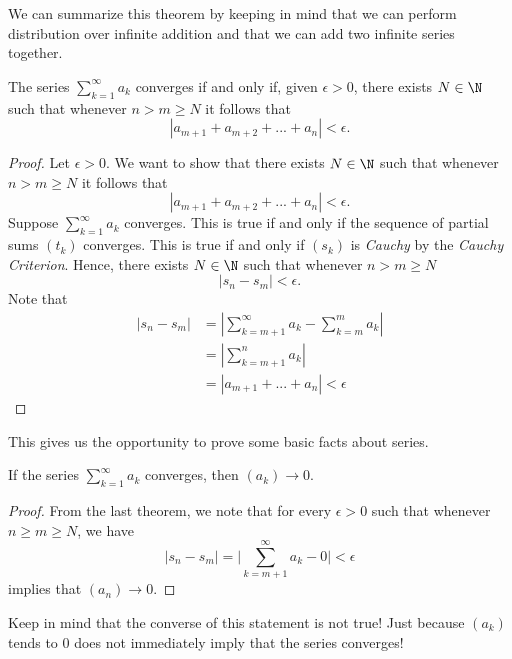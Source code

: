 We can summarize this theorem by keeping in mind that we can perform distribution over infinite addition and that we can add two infinite series together. 

\begin{tcolorbox}
    \begin{thm}
     The series \( \sum_{k=1}^{ \infty} a_k \) converges if and only if, given \( \epsilon > 0\), there exists \( N \in \N \) such that whenever \( n > m \geq N \) it follows that 
     \[ |a_{m+1} + a_{m+2} + ... + a_n| < \epsilon.\]
    \end{thm}
\end{tcolorbox}

\begin{proof}
    Let \(\epsilon > 0 \). We want to show that there exists \( N \in \N \) such that whenever \( n > m \geq N \) it follows that 
    \[|a_{m+1} + a_{m+2} + ... + a_n| < \epsilon.\]
    Suppose \( \sum_{k=1}^{\infty} a_k \) converges. This is true if and only if the sequence of partial sums \( (t_k)\) converges. This is true if and only if \( (s_k)\) is \textit{Cauchy} by the \textit{Cauchy Criterion}. Hence, there exists \( N \in \N \) such that whenever \( n > m \geq N \) 
    \[ |s_n - s_m | < \epsilon.\]
Note that 
\begin{align*}
    |s_n - s_m|&= | \sum_{k=m+1}^{\infty} a_k - \sum_{k=m}^{m} a_k|  \\
               &= |\sum_{k=m+1}^{n}a_k|\\
               &= |a_{m+1} + ... + a_n| < \epsilon
\end{align*}
\end{proof}

This gives us the opportunity to prove some basic facts about series.

\begin{tcolorbox}
\begin{thm}
If the series \( \sum_{k=1}^{\infty} a_k \) converges, then \( (a_k) \to 0\).
\end{thm}
\end{tcolorbox}

\begin{proof}
From the last theorem, we note that for every \( \epsilon > 0 \) such that whenever \(n  \geq m \geq N \), we have  
\[ | s_n - s_m| = \Big| \sum_{k=m+1}^{ \infty} a_k - 0 \Big| < \epsilon\]
implies that \( (a_n) \to 0 \).
\end{proof}

Keep in mind that the converse of this statement is not true! Just because \( (a_k)\) tends to \( 0 \) does not immediately imply that the series converges! 


